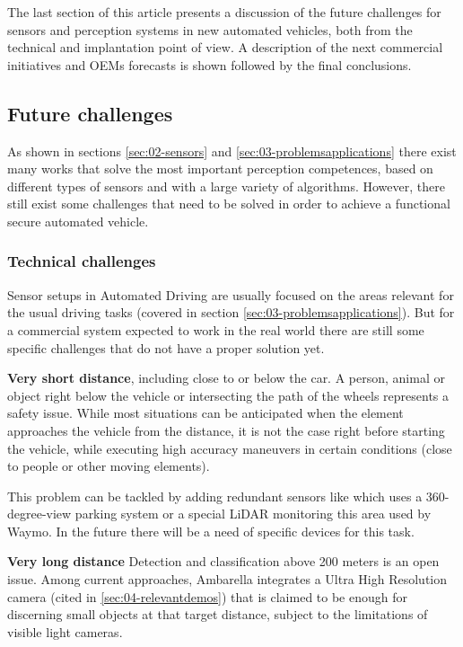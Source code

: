 
The last section of this article presents a discussion of the future challenges 
for sensors and perception systems in new automated vehicles, both from the 
technical and implantation point of view. A description of the next 
commercial initiatives and OEMs forecasts is shown followed by the final 
conclusions.


\subsection{Future challenges}

As shown in sections \ref{sec:02-sensors} and \ref{sec:03-problemsapplications} there exist many works that solve the most important perception competences, based on different types of sensors and with a large variety of algorithms. However, there still exist some challenges that need to be solved in order to achieve a functional secure automated vehicle.

\subsubsection{Technical challenges}

Sensor setups in Automated Driving are usually focused on the areas relevant 
for the usual driving tasks (covered in section \ref{sec:03-problemsapplications}). 
But for a commercial system expected to work in the real world there are still
some specific challenges that do not have a proper solution yet.

\textbf{Very short distance}, including close to or below the car.
    A person, animal or object right below the vehicle or intersecting 
    the path of the wheels represents a safety issue. While most situations
    can be anticipated when the element approaches the vehicle from the
    distance, it is not the case right before starting the vehicle, 
    while executing high accuracy maneuvers in certain conditions 
    (close to people or other moving elements).  

    This problem can be tackled by adding redundant sensors like \cite{gandhi2006vehicle}
    which uses a 360-degree-view parking system or a special LiDAR monitoring this area
    used by Waymo.    
    In the future there will be a need of specific devices for this task.
      
\textbf{Very long distance} 
    Detection and classification above 200 meters is an open issue. 
    Among current approaches, Ambarella integrates a Ultra High Resolution 
    camera (cited in \ref{sec:04-relevantdemos}) that is claimed to be enough
    for discerning small objects at that target distance, subject to the 
    limitations of visible light cameras.
    
